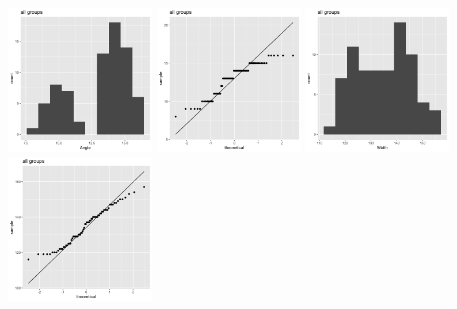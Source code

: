 \begin{center}
	\includegraphics[width=1.5in]{1_all_a_hist.png}
	\includegraphics[width=1.5in]{1_all_a_qq.png}
	\includegraphics[width=1.5in]{1_all_w_hist.png}
	\includegraphics[width=1.5in]{1_all_w_qq.png}
\end{center}
